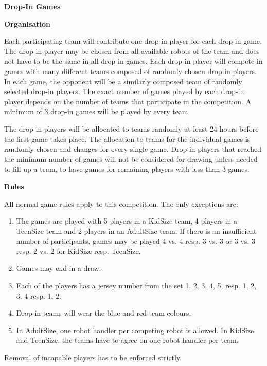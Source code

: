 \bigskip

{\bfseries Drop-In Games}

\headlinebox

{\bfseries Organisation}

Each participating team will contribute one drop-in player for each drop-in game. The drop-in player may be chosen from all available robots of the team and does not have to be the same in all drop-in games. Each drop-in player will compete in games with many different teams composed of randomly chosen drop-in players. In each game, the opponent will  be a similarly composed team of randomly selected drop-in players. The exact number of games played by each drop-in player depends on the number of teams that participate in the competition. A minimum of 3 drop-in games will be played by every team.

\bigskip

The drop-in players will be allocated to teams randomly at least 24 hours before the first game takes place. The allocation to teams for the individual games is randomly chosen and changes for every single game. Drop-in players that reached the minimum number of games will not be considered for drawing unless needed to fill up a team, to have games for remaining players with less than 3 games.

\bigskip

{\bfseries Rules}

All normal game rules apply to this competition. The only exceptions are:
\begin{enumerate}
\item The games are played with 5 players in a KidSize team, 4 players in a TeenSize team and 2 players in an AdultSize team. If there is an insufficient number of participants, games may be played 4 vs. 4 resp. 3 vs. 3 or 3 vs. 3 resp. 2 vs. 2 for KidSize resp. TeenSize.
\item Games may end in a draw.
\item Each of the players has a jersey number from the set {1, 2, 3, 4, 5}, resp. {1, 2, 3, 4} resp. {1, 2}.
\item Drop-in teams will wear the blue and red team colours.
\item In AdultSize, one robot handler per competing robot is allowed. In KidSize and TeenSize, the teams have to agree on one robot handler per team.
\end{enumerate}

Removal of incapable players has to be enforced strictly.

